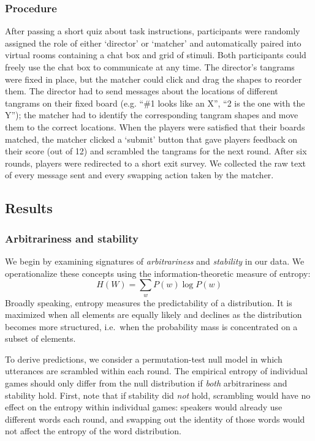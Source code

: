 \documentclass[manuscript]{stjour}
\begin{document}
\subsubsection{Procedure}\label{procedure}

After passing a short quiz about task instructions, participants were
randomly assigned the role of either `director' or `matcher' and
automatically paired into virtual rooms containing a chat box and grid
of stimuli. Both participants could freely use the chat box to
communicate at any time. The director's tangrams were fixed in place,
but the matcher could click and drag the shapes to reorder them. The
director had to send messages about the locations of different tangrams
on their fixed board (e.g. ``\#1 looks like an X'', ``2 is the one with
the Y''); the matcher had to identify the corresponding tangram shapes
and move them to the correct locations. When the players were satisfied
that their boards matched, the matcher clicked a `submit' button that
gave players feedback on their score (out of 12) and scrambled the
tangrams for the next round. After six rounds, players were redirected
to a short exit survey. We collected the raw text of every message sent
and every swapping action taken by the matcher.

\subsection{Results}\label{results}

\subsubsection{Arbitrariness and
stability}\label{arbitrariness-and-stability}

We begin by examining signatures of \emph{arbitrariness} and
\emph{stability} in our data. We operationalize these concepts using the
information-theoretic measure of entropy:
\[H(W) = \sum_w P(w) \log P(w)\] Broadly speaking, entropy measures the
predictability of a distribution. It is maximized when all elements are
equally likely and declines as the distribution becomes more structured,
i.e.~when the probability mass is concentrated on a subset of elements.

To derive predictions, we consider a permutation-test null model in
which utterances are scrambled within each round. The empirical entropy
of individual games should only differ from the null distribution if
\emph{both} arbitrariness and stability hold. First, note that if
stability did \emph{not} hold, scrambling would have no effect on the
entropy within individual games: speakers would already use different
words each round, and swapping out the identity of those words would not
affect the entropy of the word distribution.
\end{document}
